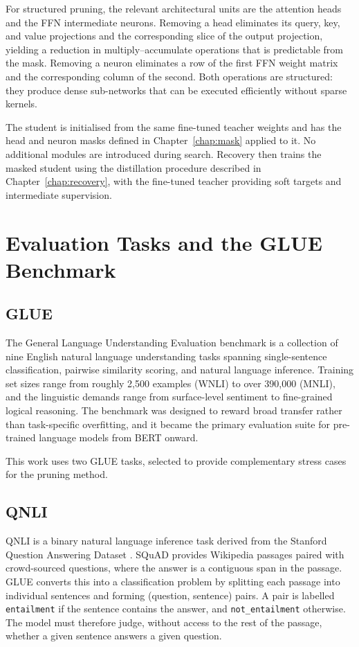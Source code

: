 For structured pruning, the relevant architectural units are the attention heads
and the FFN intermediate neurons. Removing a head eliminates its query, key, and
value projections and the corresponding slice of the output projection, yielding
a reduction in multiply--accumulate operations that is predictable from the
mask. Removing a neuron eliminates a row of the first FFN weight matrix and the
corresponding column of the second. Both operations are structured: they produce
dense sub-networks that can be executed efficiently without sparse kernels.

The student is initialised from the same fine-tuned teacher weights and has
the head and neuron masks defined in Chapter~\ref{chap:mask} applied to it.
No additional modules are introduced during search. Recovery then trains the
masked student using the distillation procedure described in
Chapter~\ref{chap:recovery}, with the fine-tuned teacher providing soft targets
and intermediate supervision.

\section{Evaluation Tasks and the GLUE Benchmark}
\label{sec:glue}

\subsection{GLUE}

The General Language Understanding Evaluation benchmark \citep{wang2018glue} is
a collection of nine English natural language understanding tasks spanning
single-sentence classification, pairwise similarity scoring, and natural
language inference. Training set sizes range from roughly 2{,}500 examples
(WNLI) to over 390{,}000 (MNLI), and the linguistic demands range from
surface-level sentiment to fine-grained logical reasoning. The benchmark was
designed to reward broad transfer rather than task-specific overfitting, and it
became the primary evaluation suite for pre-trained language models from BERT
onward.

This work uses two GLUE tasks, selected to provide complementary stress cases
for the pruning method.

\subsection{QNLI}

QNLI is a binary natural language inference task derived from the Stanford
Question Answering Dataset \citep{rajpurkar2016squad}. SQuAD provides Wikipedia
passages paired with crowd-sourced questions, where the answer is a contiguous
span in the passage. GLUE converts this into a classification problem by
splitting each passage into individual sentences and forming (question, sentence)
pairs. A pair is labelled \texttt{entailment} if the sentence contains the
answer, and \texttt{not\_entailment} otherwise. The model must therefore judge,
without access to the rest of the passage, whether a given sentence answers a
given question.

